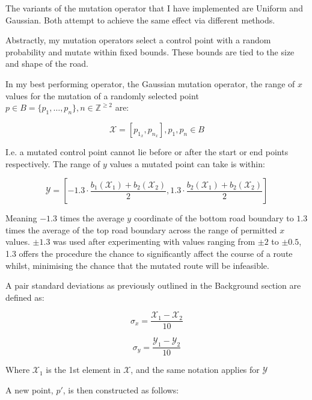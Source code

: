 The variants of the mutation operator that I have implemented are Uniform and Gaussian. Both attempt to achieve the same effect via different methods.

Abstractly, my mutation operators select a control point with a random probability and mutate within fixed bounds. These bounds are tied to the size and shape of the road.

In my best performing operator, the Gaussian mutation operator, the range of $x$ values for the mutation of a randomly selected point $ p \in B = \{ p_{1}, \ldots, p_{n} \}, n\in \mathbb{Z}^{\geq 2 }$ are:

\begin{equation}
\mathcal{X} = \left[p_{1_{x}}, p_{n_{x}}\right], p_{1}, p_{n} \in B
\end{equation}

I.e. a mutated control point cannot lie before or after the start or end points respectively. The range of $y$ values a mutated point can take is within:

\begin{equation}
  \mathcal{Y} = \left[ - 1.3 \cdot \frac{b_{1}(\mathcal{X}_{1}) + b_{2}(\mathcal{X}_{2})}{2}, 1.3 \cdot \frac{b_{2}(\mathcal{X}_{1}) + b_{2}(\mathcal{X}_{2})}{2} \right]
\end{equation}

Meaning $-1.3$ times the average $y$ coordinate of the bottom road boundary to $1.3$ times the average of the top road boundary across the range of permitted $x$ values. $\pm 1.3$ was used after experimenting with values ranging from $\pm 2$ to $\pm 0.5$, 1.3 offers the procedure the chance to significantly affect the course of a route whilst, minimising the chance that the mutated route will be infeasible.

A pair standard deviations as previously outlined in the Background section are defined as:

\begin{equation}
\sigma_{x} = \frac{\mathcal{X}_{1}-\mathcal{X}_{2}}{10}
\end{equation}

\begin{equation}
\sigma_{y} = \frac{\mathcal{Y}_{1}-\mathcal{Y}_{2}}{10}
\end{equation}

Where $\mathcal{X}_{1}$ is the 1st element in $\mathcal{X}$, and the same notation applies for $\mathcal{Y}$

A new point, $p'$, is then constructed as follows:

